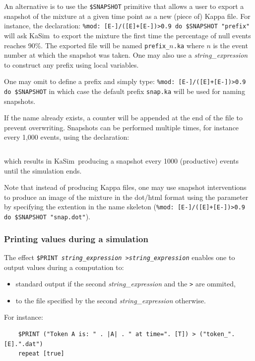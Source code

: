 \documentclass[11pt]{book}
\def\KaSim{\textsf{KaSim}}
\def\ttt#1{\texttt{#1}}
\begin{document}
An alternative is to use the \ttt{\$SNAPSHOT} primitive
that allows a user to export a snapshot of the mixture
at a given time point as a new (piece of) Kappa file.  For instance,
the declaration:
\lstinline[language=kappa]*%mod: [E-]/([E]+[E-])>0.9 do $SNAPSHOT "prefix"*
will ask \KaSim~to export
the mixture the first time the percentage of null
events reaches 90\%. The exported file will be named
\ttt{prefix\_$n$.ka} where $n$ is the event number at which the
snapshot was taken. One may also use a \textit{string\_expression} to
construct any prefix using local variables.

One may omit to define a prefix and simply type:
\lstinline[language=kappa]!%mod: [E-]/([E]+[E-])>0.9 do $SNAPSHOT!
in which case the default prefix \ttt{snap.ka} will be used for naming snapshots.

If the name already exists, a counter will be appended at the end of
the file to prevent overwriting. Snapshots can be performed multiple
times, for instance every 1,000 events, using the
declaration:
\begin{lstlisting}[language=kappa]
%mod: ([E] [mod] 1000)=0 do $SNAPSHOT "abc.ka" repeat [true]
\end{lstlisting}
which results in \KaSim~producing a snapshot every 1000 (productive) events until the simulation ends.

Note that instead of producing Kappa files, one may use snapshot
interventions to produce an image of the mixture in the
dot/html format using the parameter by specifying the extention in the
name skeleton
(\lstinline[language=kappa]!%mod: [E-]/([E]+[E-])>0.9 do $SNAPSHOT "snap.dot"!).

\subsubsection{Printing values during a simulation}
The effect \ttt{\$PRINT \textit{string\_expression}
   >\textit{string\_expression}} enables one to output values during a
computation to:
\begin{itemize}
\item standard output if the second \textit{string\_expression} and
  the \ttt{>} are ommited,
\item to the file specified by the second \textit{string\_expression} otherwise.
\end{itemize}
For instance:
\begin{lstlisting}[language=kappa]
%mod: |A|<0 do
    $PRINT ("Token A is: " . |A| . " at time=". [T]) > ("token_".[E].".dat")
    repeat [true]
\end{lstlisting}
\end{document}

